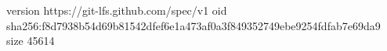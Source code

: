 version https://git-lfs.github.com/spec/v1
oid sha256:f8d7938b54d69b81542dfef6e1a473af0a3f849352749ebe9254fdfab7e69da9
size 45614
